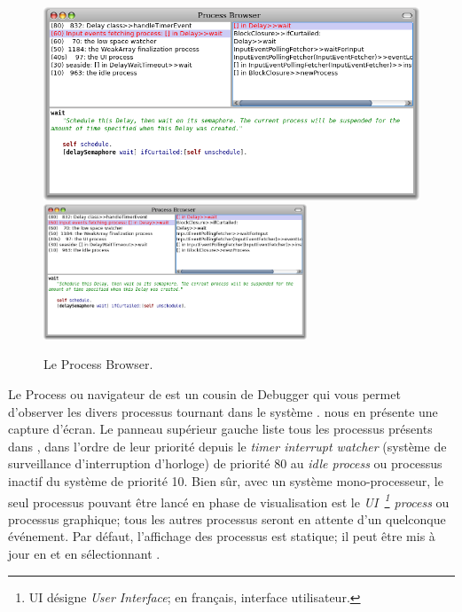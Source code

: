 \documentclass[a4paper,10pt,twoside]{book}
\begin{document}
\begin{figure}[btp]
	\begin{center}
	\ifluluelse
		{\includegraphics[width=\textwidth]{processBrowser}}
		{\includegraphics[width=0.7\textwidth]{processBrowser}}
	\end{center}
	\caption{Le Process Browser.}
\end{figure}

Le Process  ou navigateur de  
est un cousin de Debugger qui vous permet d'observer les divers processus tournant
dans le système \pharo.
 nous en présente une capture d'écran.
Le panneau supérieur gauche liste tous les processus présents dans \pharo, 
dans l'ordre de leur priorité depuis le \emph{timer interrupt watcher} 
(système de surveillance d'interruption d'horloge) de priorité
80 au \emph{idle process} ou processus inactif du système de priorité 10.
Bien sûr, avec un système mono-processeur, le seul processus pouvant être 
lancé en phase de visualisation est le \emph{UI~\footnote{UI désigne 
\emph{User Interface}; en français, interface utilisateur.} process} 
ou processus graphique;
tous les autres processus seront en attente d'un quelconque événement.
Par défaut, l'affichage des processus est statique; il peut être
mis à jour en \actclickant{} et en sélectionnant . %
\end{document}
